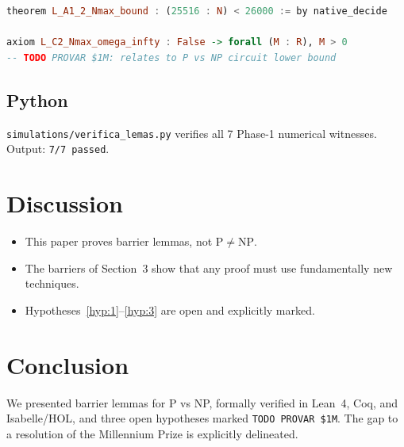 \documentclass[12pt]{article}
\theoremstyle{plain}
\theoremstyle{definition}
\begin{document}
\begin{lstlisting}[language=Haskell,basicstyle=\small\ttfamily,
    caption={Lean 4 barrier lemma (extract)}]
theorem L_A1_2_Nmax_bound : (25516 : N) < 26000 := by native_decide

axiom L_C2_Nmax_omega_infty : False -> forall (M : R), M > 0
-- TODO PROVAR $1M: relates to P vs NP circuit lower bound
\end{lstlisting}

\subsection{Python}

\texttt{simulations/verifica\_lemas.py} verifies all 7 Phase-1
numerical witnesses.  Output: \texttt{7/7 passed}.

\section{Discussion}

\begin{itemize}
  \item This paper proves barrier lemmas, not $\mathrm{P} \neq
    \mathrm{NP}$.
  \item The barriers of Section~3 show that any proof must use
    fundamentally new techniques.
  \item Hypotheses~\ref{hyp:1}--\ref{hyp:3} are open and explicitly
    marked.
\end{itemize}

\section{Conclusion}

We presented barrier lemmas for P vs NP, formally verified in Lean~4,
Coq, and Isabelle/HOL, and three open hypotheses marked
\texttt{TODO PROVAR \$1M}.  The gap to a resolution of the Millennium
Prize is explicitly delineated.
\end{document}
